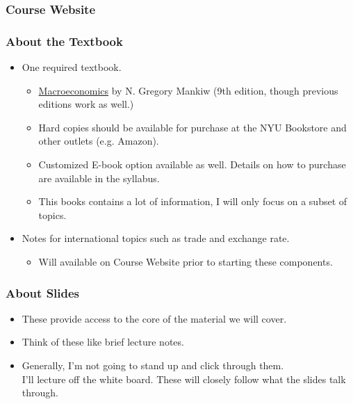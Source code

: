 \documentclass[10pt]{beamer}
\begin{document}

\begin{frame}[t]
\frametitle{Course Website}
\bigskip
\bigskip
\end{frame}


\begin{frame}[t]
\frametitle{About the Textbook}
\begin{itemize}
\item One required textbook.
\begin{itemize}
\medskip
\item \href{http://www.amazon.com/Macroeconomics-N-Gregory-Mankiw/dp/1429240024}{Macroeconomics} by N. Gregory Mankiw (9th edition, though previous editions work as well.)
    \medskip
\item Hard copies should be available for purchase at the NYU Bookstore and other outlets (e.g. Amazon).
    \medskip
\item Customized E-book option available as well. Details on how to purchase are available in the syllabus.
\medskip
\item This books contains a lot of information, I will only focus on a subset of topics.
\end{itemize}
\bigskip
\item Notes for international topics such as trade and exchange rate.
\begin{itemize}
\medskip
\item Will available on Course Website prior to starting these components.
\end{itemize}
\end{itemize}
\end{frame}



\begin{frame}[t]
\frametitle{About Slides}
\begin{itemize}
\item These provide access to the core of the material we will cover.
\bigskip
\item Think of these like brief lecture notes.
\bigskip
\item Generally, I'm not going to stand up and click through them.\\
\bigskip
 I'll lecture off the white board. These will closely follow what the slides talk through.
\end{itemize}
\end{frame}
\end{document}
